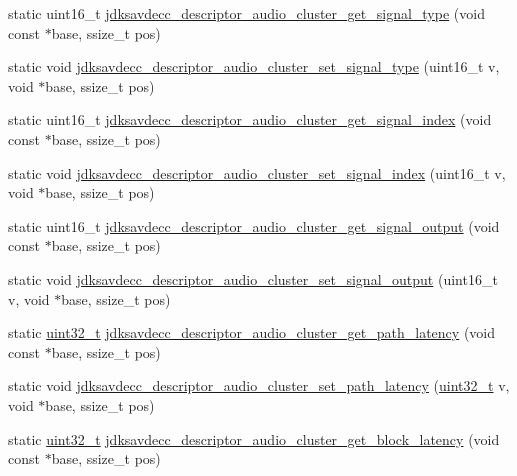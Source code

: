 \begin{DoxyCompactItemize}
static uint16\+\_\+t \hyperlink{group__descriptor__audio__cluster_ga76d46b9ee4647320d0c7728e45ef657c}{jdksavdecc\+\_\+descriptor\+\_\+audio\+\_\+cluster\+\_\+get\+\_\+signal\+\_\+type} (void const $\ast$base, ssize\+\_\+t pos)
\item 
static void \hyperlink{group__descriptor__audio__cluster_gada4d72079ba2c862cc4f5be6634dfa09}{jdksavdecc\+\_\+descriptor\+\_\+audio\+\_\+cluster\+\_\+set\+\_\+signal\+\_\+type} (uint16\+\_\+t v, void $\ast$base, ssize\+\_\+t pos)
\item 
static uint16\+\_\+t \hyperlink{group__descriptor__audio__cluster_ga515d1b65fae4a1cb18ab21df215c669b}{jdksavdecc\+\_\+descriptor\+\_\+audio\+\_\+cluster\+\_\+get\+\_\+signal\+\_\+index} (void const $\ast$base, ssize\+\_\+t pos)
\item 
static void \hyperlink{group__descriptor__audio__cluster_ga77b3b8c01903f9e71743a1daa1645363}{jdksavdecc\+\_\+descriptor\+\_\+audio\+\_\+cluster\+\_\+set\+\_\+signal\+\_\+index} (uint16\+\_\+t v, void $\ast$base, ssize\+\_\+t pos)
\item 
static uint16\+\_\+t \hyperlink{group__descriptor__audio__cluster_ga261ce66a86f378302588a63e545b045b}{jdksavdecc\+\_\+descriptor\+\_\+audio\+\_\+cluster\+\_\+get\+\_\+signal\+\_\+output} (void const $\ast$base, ssize\+\_\+t pos)
\item 
static void \hyperlink{group__descriptor__audio__cluster_gaa4565dffa3e72ebd16d16b544c1ecaf1}{jdksavdecc\+\_\+descriptor\+\_\+audio\+\_\+cluster\+\_\+set\+\_\+signal\+\_\+output} (uint16\+\_\+t v, void $\ast$base, ssize\+\_\+t pos)
\item 
static \hyperlink{parse_8c_a6eb1e68cc391dd753bc8ce896dbb8315}{uint32\+\_\+t} \hyperlink{group__descriptor__audio__cluster_ga7058fe96d0ed970e15e272ada2c1c091}{jdksavdecc\+\_\+descriptor\+\_\+audio\+\_\+cluster\+\_\+get\+\_\+path\+\_\+latency} (void const $\ast$base, ssize\+\_\+t pos)
\item 
static void \hyperlink{group__descriptor__audio__cluster_ga7c382943e8a3c0f03bc31750f884bd88}{jdksavdecc\+\_\+descriptor\+\_\+audio\+\_\+cluster\+\_\+set\+\_\+path\+\_\+latency} (\hyperlink{parse_8c_a6eb1e68cc391dd753bc8ce896dbb8315}{uint32\+\_\+t} v, void $\ast$base, ssize\+\_\+t pos)
\item 
static \hyperlink{parse_8c_a6eb1e68cc391dd753bc8ce896dbb8315}{uint32\+\_\+t} \hyperlink{group__descriptor__audio__cluster_ga664f971791a1b29b00c29128fe603bbb}{jdksavdecc\+\_\+descriptor\+\_\+audio\+\_\+cluster\+\_\+get\+\_\+block\+\_\+latency} (void const $\ast$base, ssize\+\_\+t pos)

\end{DoxyCompactItemize}
